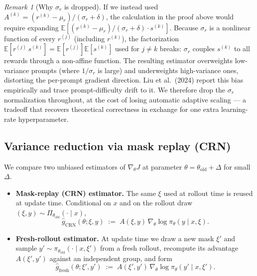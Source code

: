 \documentclass[11pt]{article}
\theoremstyle{definition}
\theoremstyle{remark}
\newtheorem{remark}[theorem]{Remark}
\newcommand{\E}{\mathbb{E}}
\newcommand{\old}{\mathrm{old}}
\begin{document}
\begin{remark}[Why $\sigma_r$ is dropped]
\label{rem:sigma}
If we instead used $A^{(k)} = (r^{(k)} - \mu_r)/(\sigma_r + \delta)$, the
calculation in the proof above would require expanding
$\E[(r^{(k)} - \mu_r)/(\sigma_r+\delta)\cdot s^{(k)}]$.  Because
$\sigma_r$ is a nonlinear function of every $r^{(j)}$ (including
$r^{(k)}$), the factorization
$\E[r^{(j)}\,s^{(k)}] = \E[r^{(j)}]\E[s^{(k)}]$ used for $j \neq k$
breaks: $\sigma_r$ couples $s^{(k)}$ to all rewards through a non-affine
function.  The resulting estimator overweights low-variance prompts (where
$1/\sigma_r$ is large) and underweights high-variance ones, distorting the
per-prompt gradient direction.  Liu et al.\ (2024) report this bias
empirically and trace prompt-difficulty drift to it.  We therefore drop
the $\sigma_r$ normalization throughout, at the cost of losing automatic
adaptive scaling --- a tradeoff that recovers theoretical correctness in
exchange for one extra learning-rate hyperparameter.
\end{remark}

\subsection{Variance reduction via mask replay (CRN)}
\label{sec:crn}

We compare two unbiased estimators of $\nabla_\theta J$ at parameter
$\theta = \theta_\old + \Delta$ for small $\Delta$.

\begin{itemize}[topsep=2pt,itemsep=2pt]
\item \textbf{Mask-replay (CRN) estimator.}  The same $\xi$ used at
      rollout time is reused at update time.  Conditional on $x$ and on
      the rollout draw $(\xi, y) \sim \Pi_{\theta_\old}(\cdot\mid x)$,
      \begin{equation}
      \hat g_{\mathrm{CRN}}(\theta;\xi,y)
        \;:=\;
      A(\xi,y)\,\nabla_\theta \log \pi_\theta(y\mid x,\xi).
      \end{equation}
\item \textbf{Fresh-rollout estimator.}  At update time we draw a new
      mask $\xi'$ and sample $y' \sim \pi_{\theta_\old}(\cdot\mid x,\xi')$
      from a fresh rollout, recompute its advantage
      $A(\xi',y')$ against an independent group, and form
      \begin{equation}
      \hat g_{\mathrm{fresh}}(\theta;\xi',y')
        \;:=\;
      A(\xi',y')\,\nabla_\theta \log \pi_\theta(y'\mid x,\xi').
      \end{equation}
\end{itemize}
\end{document}

